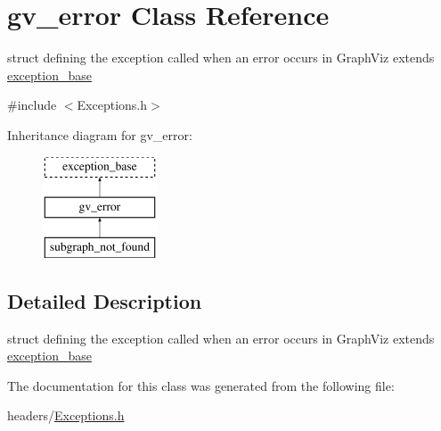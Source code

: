 \hypertarget{structgv__error}{\section{gv\-\_\-error \-Class \-Reference}
\label{structgv__error}
}


struct defining the exception called when an error occurs in \-Graph\-Viz extends \hyperlink{structexception__base}{exception\-\_\-base}  




{\ttfamily \#include $<$\-Exceptions.\-h$>$}

\-Inheritance diagram for gv\-\_\-error\-:\begin{figure}[H]
\begin{center}
\leavevmode
\includegraphics[height=3.000000cm]{structgv__error}
\end{center}
\end{figure}


\subsection{\-Detailed \-Description}
struct defining the exception called when an error occurs in \-Graph\-Viz extends \hyperlink{structexception__base}{exception\-\_\-base} 

\-The documentation for this class was generated from the following file\-:\begin{DoxyCompactItemize}
\item 
headers/\hyperlink{_exceptions_8h}{\-Exceptions.\-h}\end{DoxyCompactItemize}

